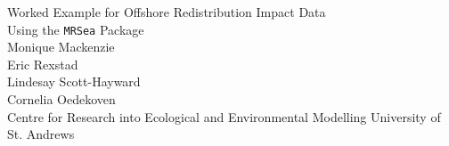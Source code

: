 
\begin{titlepage}

\begin{center}
\vspace* {0.70 in}
\huge{Worked Example for Offshore Redistribution Impact Data}\\[0.5 cm]
\Large{Using the {\tt MRSea} Package}\\

\vspace{1 in}
\Large{Monique Mackenzie}\\
\Large{Eric Rexstad}\\
\Large{Lindesay Scott-Hayward}\\
\Large{Cornelia Oedekoven}\\[0.5 cm]

\vspace{0.7 in}
\Large{Centre for Research into Ecological and Environmental Modelling}
\Large{University of St. Andrews}

\thispagestyle{empty}

\end{center}

\end{titlepage}
